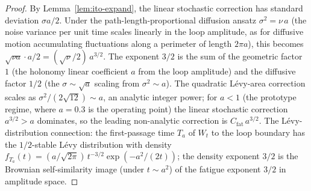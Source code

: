 \documentclass[11pt,a4paper]{article}
\theoremstyle{plain}
\theoremstyle{definition}
\theoremstyle{remark}
\begin{document}
\begin{proof}
By Lemma~\ref{lem:ito-expand}, the linear stochastic correction has
standard deviation $\sigma a/2$. Under the path-length-proportional
diffusion ansatz $\sigma^{2}=\nu\,a$ (the noise variance per unit time
scales linearly in the loop amplitude, as for diffusive motion
accumulating fluctuations along a perimeter of length $2\pi a$), this
becomes $\sqrt{\nu a}\cdot a/2=(\sqrt{\nu}/2)\,a^{3/2}$. The exponent
$3/2$ is the sum of the geometric factor $1$ (the holonomy linear
coefficient $a$ from the loop amplitude) and the diffusive factor
$1/2$ (the $\sigma\sim\sqrt{a}$ scaling from $\sigma^{2}\sim a$). The
quadratic L\'evy-area correction scales as $\sigma^{2}/(2\sqrt{12})\sim
a$, an analytic integer power; for $a<1$ (the prototype regime, where
$a=0.3$ is the operating point) the linear stochastic correction
$a^{3/2}>a$ dominates, so the leading non-analytic correction is
$C_{\mathrm{fat}}\,a^{3/2}$. The L\'evy-distribution connection: the
first-passage time $T_{a}$ of $W_{t}$ to the loop boundary has the
$1/2$-stable L\'evy distribution with density
$f_{T_{a}}(t)=(a/\sqrt{2\pi})\,t^{-3/2}\exp(-a^{2}/(2t))$; the density
exponent $3/2$ is the Brownian self-similarity image (under $t\sim
a^{2}$) of the fatigue exponent $3/2$ in amplitude space.
\end{proof}
\end{document}
